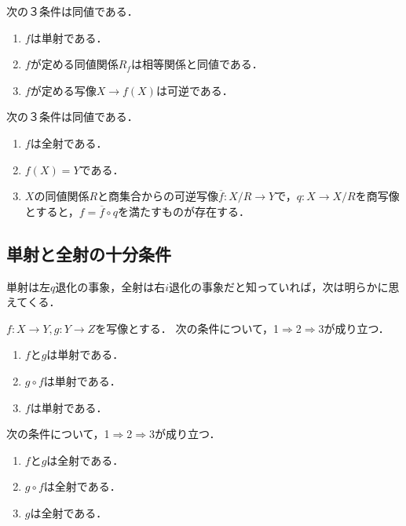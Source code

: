 \documentclass[uplatex,dvipdfmx]{jsreport}
\begin{document}
\begin{proposition}[全射と単射の特徴付け]
    次の３条件は同値である．
    \begin{enumerate}
        \item $f$は単射である．
        \item $f$が定める同値関係$R_f$は相等関係と同値である．
        \item $f$が定める写像$X\to f(X)$は可逆である．
    \end{enumerate}
    次の３条件は同値である．
    \begin{enumerate}
        \item $f$は全射である．
        \item $f(X)=Y$である．
        \item $X$の同値関係$R$と商集合からの可逆写像$\overline{f}:X/R\to Y$で，$q:X\to X/R$を商写像とすると，$f=\overline{f}\circ q$を満たすものが存在する．
    \end{enumerate}
\end{proposition}

\subsection{単射と全射の十分条件}

\begin{tcolorbox}[colframe=ForestGreen, colback=ForestGreen!10!white,breakable,colbacktitle=ForestGreen!40!white,coltitle=black,fonttitle=\bfseries\sffamily,
title=]
単射は左$q$退化の事象，全射は右$i$退化の事象だと知っていれば，次は明らかに思えてくる．
\end{tcolorbox}

\begin{lemma}
    $f:X\to Y, g:Y\to Z$を写像とする．
    次の条件について，1$\Rightarrow$2$\Rightarrow$3が成り立つ．
    \begin{enumerate}
        \item $f$と$g$は単射である．
        \item $g\circ f$は単射である．
        \item $f$は単射である．
    \end{enumerate}
    次の条件について，1$\Rightarrow$2$\Rightarrow$3が成り立つ．
    \begin{enumerate}
        \item $f$と$g$は全射である．
        \item $g\circ f$は全射である．
        \item $g$は全射である．
    \end{enumerate}
\end{lemma}
\end{document}
